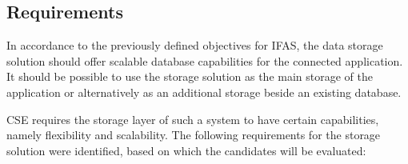 \subsection{Requirements}
\label{subsec:classifications:storage:req}

In accordance to the previously defined objectives for \ac{IFAS}, the data storage solution should offer scalable database capabilities for the connected application.
It should be possible to use the storage solution as the main storage of the application or alternatively as an additional storage beside an existing database.

\ac{CSE} requires the storage layer of such a system to have certain capabilities, namely flexibility and scalability.
The following requirements for the storage solution were identified, based on which the candidates will be evaluated:

